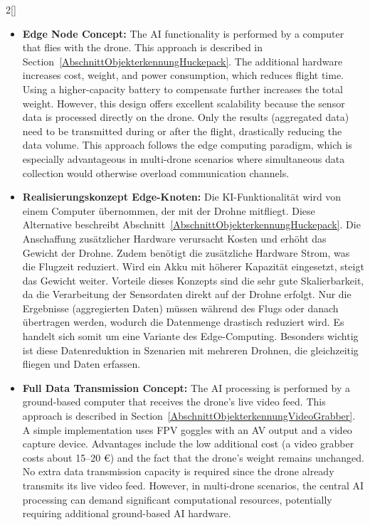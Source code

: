 \begin{paracol}{2}[]
\coleng

\begin{itemize}
\item \textbf{Edge Node Concept:} The AI functionality is performed by a computer that flies with the drone. This approach is described in Section~\ref{AbschnittObjekterkennungHuckepack}. The additional hardware increases cost, weight, and power consumption, which reduces flight time. Using a higher-capacity battery to compensate further increases the total weight. However, this design offers excellent scalability because the sensor data is processed directly on the drone. Only the results (aggregated data) need to be transmitted during or after the flight, drastically reducing the data volume. This approach follows the edge computing paradigm, which is especially advantageous in multi-drone scenarios where simultaneous data collection would otherwise overload communication channels.
\end{itemize}

\colger

\begin{itemize}
\item \textbf{Realisierungskonzept Edge-Knoten:} Die KI-Funktionalität wird von einem Computer übernommen, der mit der Drohne mitfliegt. Diese Alternative beschreibt Abschnitt~\ref{AbschnittObjekterkennungHuckepack}. Die Anschaffung zusätzlicher Hardware verursacht Kosten und erhöht das Gewicht der Drohne. Zudem benötigt die zusätzliche Hardware Strom, was die Flugzeit reduziert. Wird ein Akku mit höherer Kapazität eingesetzt, steigt das Gewicht weiter. Vorteile dieses Konzepts sind die sehr gute Skalierbarkeit, da die Verarbeitung der Sensordaten direkt auf der Drohne erfolgt. Nur die Ergebnisse (aggregierten Daten) müssen während des Flugs oder danach übertragen werden, wodurch die Datenmenge drastisch reduziert wird. Es handelt sich somit um eine Variante des Edge-Computing. Besonders wichtig ist diese Datenreduktion in Szenarien mit mehreren Drohnen, die gleichzeitig fliegen und Daten erfassen.
\end{itemize}

\coleng

\begin{itemize}
\item \textbf{Full Data Transmission Concept:} The AI processing is performed by a ground-based computer that receives the drone’s live video feed. This approach is described in Section~\ref{AbschnittObjekterkennungVideoGrabber}. A simple implementation uses FPV goggles with an AV output and a video capture device. Advantages include the low additional cost (a video grabber costs about 15--20 €) and the fact that the drone’s weight remains unchanged. No extra data transmission capacity is required since the drone already transmits its live video feed. However, in multi-drone scenarios, the central AI processing can demand significant computational resources, potentially requiring additional ground-based AI hardware.
\end{itemize}


\end{paracol}
